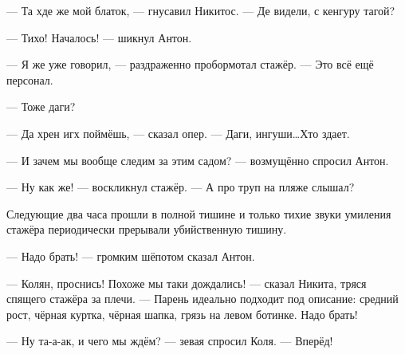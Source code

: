 --- Та хде же мой блаток, --- гнусавил Никитос. --- Де видели, с кенгуру тагой?

--- Тихо! Началось! --- шикнул Антон.

--- Я же уже говорил, --- раздраженно пробормотал стажёр. --- Это всё ещё персонал.

--- Тоже даги?

--- Да хрен игх поймёшь, --- сказал опер. --- Даги, ингуши\ldots Хто здает.

--- И зачем мы вообще следим за этим садом? --- возмущённо спросил Антон.

--- Ну как же! --- воскликнул стажёр. --- А про труп на пляже слышал?

Следующие два часа прошли в полной тишине и только тихие звуки умиления стажёра периодически прерывали убийственную тишину. 

\asterisks

--- Надо брать! --- громким шёпотом сказал Антон.

--- Колян, проснись! Похоже мы таки дождались! --- сказал Никита, тряся спящего стажёра за плечи. --- Парень идеально подходит под описание: средний рост, чёрная куртка, чёрная шапка, грязь на левом ботинке. Надо брать!

--- Ну та-а-ак, и чего мы ждём? --- зевая спросил Коля. --- Вперёд!


